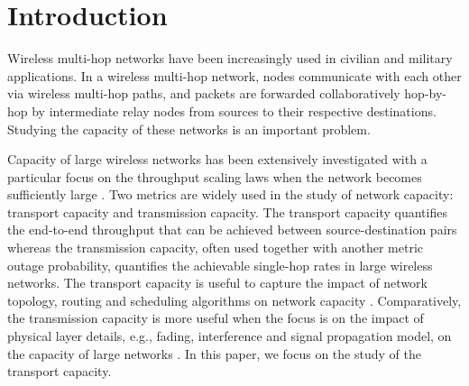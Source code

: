 \documentclass[english]{IEEEtran}
\theoremstyle{plain}
\theoremstyle{plain}
\theoremstyle{plain}
\theoremstyle{remark}
\begin{document}
\section{Introduction\label{sec:Introduction}}

Wireless multi-hop networks have been increasingly used in civilian
and military applications. In a wireless multi-hop network, nodes
communicate with each other via wireless multi-hop paths, and packets
are forwarded collaboratively hop-by-hop by intermediate relay nodes
from sources to their respective destinations. Studying the capacity
of these networks is an important problem. 

Capacity of large wireless networks has been extensively investigated
with a particular focus on the throughput scaling laws when the network
becomes sufficiently large \cite{Chau11Capacity,Cho06Capacity,Dousse06On,Franceschetti07Closing,Grossglauser02Mobility,Gupta00Capacity,Gupta00Internets,Hu10A,Kulkarni04A,Li09Impacts,Xie04A}.
Two metrics are widely used in the study of network capacity: transport
capacity and transmission capacity. The transport capacity quantifies
the end-to-end throughput that can be achieved between source-destination
pairs whereas the transmission capacity, often used together with
another metric\emph{ }outage probability, quantifies the achievable
single-hop rates in large wireless networks. The transport capacity
is useful to capture the impact of network topology, routing and scheduling
algorithms on network capacity \cite{Alfano09Capacity,Chau11Capacity,Cho06Capacity,Dousse06On,Franceschetti07Closing,Grossglauser02Mobility,Gupta00Capacity,Hu10A,Kulkarni04A,Li09Impacts,Li11The,Yang12Capacity}.
Comparatively, the transmission capacity is more useful when the focus
is on the impact of physical layer details, e.g., fading, interference
and signal propagation model, on the capacity of large networks \cite{Andrews10Random,Ganti11High,Ganti09Interference,Weber10An,Baccelli09Stochastic}.
In this paper, we focus on the study of the transport capacity.
\end{document}
